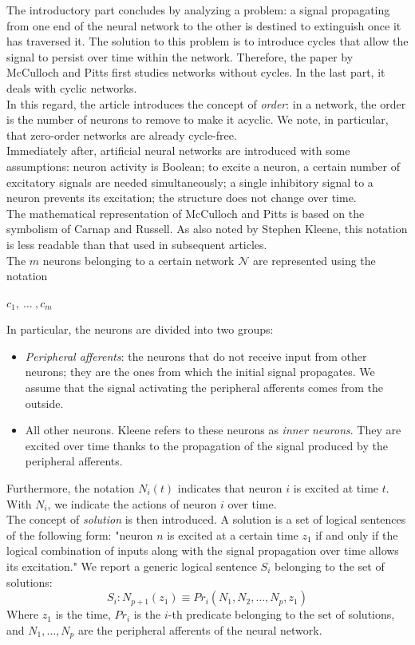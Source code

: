 \documentclass[10pt]{article}
\begin{document}
The introductory part concludes by analyzing a problem: a signal propagating from one end of the neural network to the other is destined to extinguish once it has traversed it. The solution to this problem is to introduce cycles that allow the signal to persist over time within the network. Therefore, the paper by McCulloch and Pitts first studies networks without cycles. In the last part, it deals with cyclic networks.\\
In this regard, the article introduces the concept of \emph{order}: in a network, the order is the number of neurons to remove to make it acyclic. We note, in particular, that zero-order networks are already cycle-free.\\
Immediately after, artificial neural networks are introduced with some assumptions: neuron activity is Boolean; to excite a neuron, a certain number of excitatory signals are needed simultaneously; a single inhibitory signal to a neuron prevents its excitation; the structure does not change over time.\\
The mathematical representation of McCulloch and Pitts is based on the symbolism of Carnap\cite{Carnap1937} and Russell\cite{Russell1925}. As also noted by Stephen Kleene, this notation is less readable than that used in subsequent articles.\\
The $m$ neurons belonging to a certain network $\mathcal{N}$ are represented using the notation
\begin{center}
	$c_1,\ \ldots\ , c_m$
\end{center}
In particular, the neurons are divided into two groups:
\begin{itemize}
	\item \emph{Peripheral afferents}: the neurons that do not receive input from other neurons; they are the ones from which the initial signal propagates. We assume that the signal activating the peripheral afferents comes from the outside.
	\item All other neurons. Kleene refers to these neurons as \emph{inner neurons}. They are excited over time thanks to the propagation of the signal produced by the peripheral afferents.
\end{itemize}
Furthermore, the notation $N_i(t)$ indicates that neuron $i$ is excited at time $t$. With $N_i$, we indicate the actions of neuron $i$ over time.\\
The concept of \emph{solution} is then introduced. A solution is a set of logical sentences of the following form: "neuron $n$ is excited at a certain time $z_1$ if and only if the logical combination of inputs along with the signal propagation over time allows its excitation." We report a generic logical sentence $S_i$ belonging to the set of solutions:
\begin{equation}
	S_i: N_{p+1}(z_1) \equiv Pr_i(N_1, N_2, \ldots, N_p, z_1)
\end{equation}
Where $z_1$ is the time, $Pr_i$ is the $i$-th predicate belonging to the set of solutions, and $N_1, \ldots, N_p$ are the peripheral afferents of the neural network.\\
\end{document}
